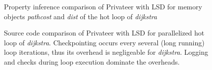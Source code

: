 \begin{figure}
\centering
{}
\qquad
{}
\caption{Property inference comparison of Privateer with LSD for memory
objects \textit{pathcost} and \textit{dist} of the hot loop of \textit{dijkstra}}
\label{fig:dijkstra_motivation_comparison}
\end{figure}

\begin{figure}
\centering
\scriptsize
{}
\qquad
\qquad
{}
\caption{Source code comparison of Privateer with LSD for parallelized hot loop
of \textit{dijkstra}. Checkpointing occurs every several (long running) loop iterations, thus its
overhead is negligeable for \textit{dijkstra}. Logging and checks
during loop execution dominate the overheads.}
\label{fig:dijkstra_motivation_comparison_source_code}
\end{figure}



